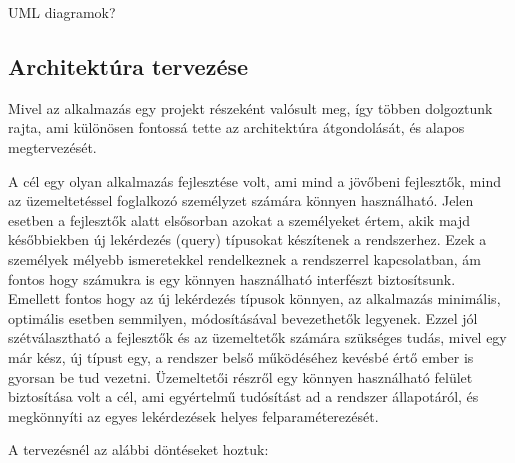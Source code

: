 \todo UML diagramok?
\subsection{Architektúra tervezése}

Mivel az alkalmazás egy projekt részeként valósult meg, így többen dolgoztunk rajta, ami különösen fontossá tette az architektúra átgondolását, és alapos megtervezését. 

A cél egy olyan alkalmazás fejlesztése volt, ami mind a jövőbeni fejlesztők, mind az üzemeltetéssel foglalkozó személyzet számára könnyen használható. Jelen esetben a fejlesztők alatt elsősorban azokat a személyeket értem, akik majd későbbiekben új lekérdezés (query) típusokat készítenek a rendszerhez. Ezek a személyek mélyebb ismeretekkel rendelkeznek a rendszerrel kapcsolatban, ám fontos hogy számukra is egy könnyen használható interfészt biztosítsunk. Emellett fontos hogy az új lekérdezés típusok könnyen, az alkalmazás minimális, optimális esetben semmilyen, módosításával bevezethetők legyenek. Ezzel jól szétválasztható a fejlesztők és az üzemeltetők számára szükséges tudás, mivel egy már kész, új típust egy, a rendszer belső működéséhez kevésbé értő ember is gyorsan be tud vezetni. Üzemeltetői részről egy könnyen használható felület biztosítása volt a cél, ami egyértelmű tudósítást ad a rendszer állapotáról, és megkönnyíti az egyes lekérdezések helyes felparaméterezését.

A tervezésnél az alábbi döntéseket hoztuk:

